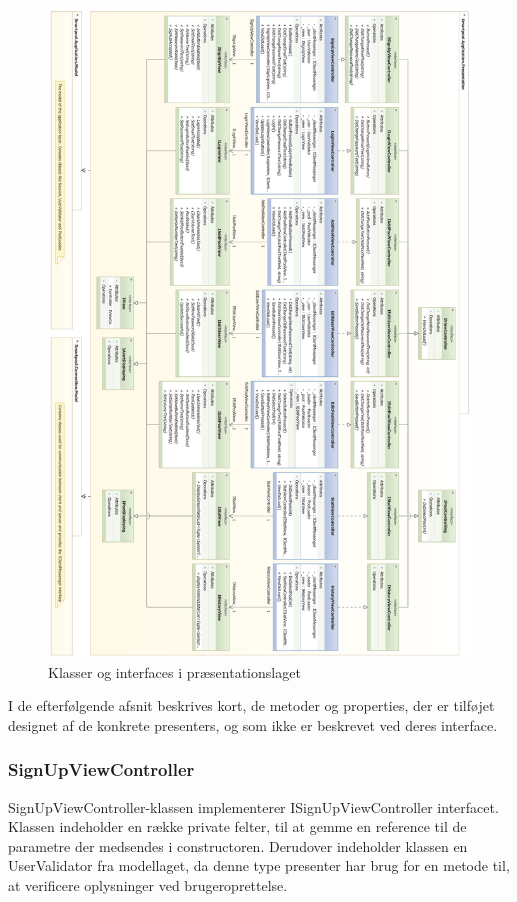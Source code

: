 \begin{figure}
	\centering
	\includegraphics[width=0.9\linewidth]{figs/design/application_presentation_full}
	\caption{Klasser og interfaces i præsentationslaget}
	\label{fig:application_presentation_full}
\end{figure}

I de efterfølgende afsnit beskrives kort, de metoder og properties, der er tilføjet designet af de konkrete presenters, og som ikke er beskrevet ved deres interface.

\subsubsection{SignUpViewController}
SignUpViewController-klassen implementerer ISignUpViewController interfacet. Klassen indeholder en række private felter, til at gemme en reference til de parametre der medsendes i constructoren. Derudover indeholder klassen en UserValidator fra modellaget, da denne type presenter har brug for en metode til, at verificere oplysninger ved brugeroprettelse.

